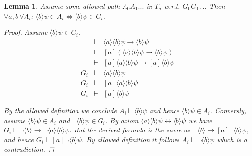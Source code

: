 \documentclass[11pt]{article}
\newtheorem{lemma}[theorem]{Lemma}
\theoremstyle{definition}
\theoremstyle{remark}
\begin{document}
\begin{lemma}
    Assume some allowed path $A_0A_1...$ in $T_a$ w.r.t. $G_0G_1...$. Then $\forall a,b \, \forall A_i$: $\langle b \rangle \psi \in A_i \iff \langle b \rangle \psi \in G_i$. 
    \begin{proof}
        
        Assume $\langle b \rangle \psi \in G_i$.
        \[
                \begin{array}{rll} 
                &  \vdash& \langle a \rangle \langle b \rangle \psi \rightarrow \langle b \rangle \psi \\
                &  \vdash &[a](\langle a \rangle \langle b \rangle \psi \rightarrow \langle b \rangle \psi) \\
                &  \vdash &[a] \langle a \rangle \langle b \rangle \psi \rightarrow [a] \langle b \rangle \psi \\
                G_i &\vdash& \langle a \rangle \langle b \rangle \psi \\
                G_i &\vdash & [a] \langle a \rangle \langle b \rangle \psi \\
                G_i &\vdash& [a] \langle b \rangle \psi

        \end{array}
        \]
        
        
        By the allowed definition we conclude $A_i \vdash \langle b \rangle \psi$ and hence $\langle b \rangle \psi \in A_i$.
        Conversly, assume $\langle b \rangle \psi \in A_i$ and $\neg \langle b \rangle \psi \in G_i$.
        By axiom $\langle a \rangle \langle b \rangle \psi \leftrightarrow \langle b \rangle \psi$ we have $G_i \vdash \neg \langle b \rangle \rightarrow \neg \langle a \rangle \langle b \rangle \psi$.
        But the derived formula is the same as $\neg \langle b \rangle \rightarrow [a] \neg \langle b \rangle \psi$,
        and hence $G_i \vdash [a] \neg \langle b \rangle \psi$. By allowed definition it follows $A_i \vdash \neg \langle b \rangle \psi$ which is a contradiction.
    \end{proof}
\end{lemma}
\end{document}
